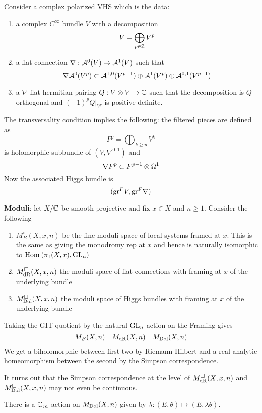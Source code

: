 \documentclass[12pt]{article}
\begin{document}
\begin{example}
Consider a complex polarized VHS which is the data:
\begin{enumerate}
\item a complex $C^{\infty}$ bundle $V$ with a decomposition
\[ V = \bigoplus_{p \in \mathbb{Z}} V^p \]
\item a flat connection $\nabla : \mathcal{A}^0(V) \to \mathcal{A}^1(V)$ such that
\[ \nabla \mathcal{A}^0(V^p) \subset \mathcal{A}^{1,0}(V^{p-1}) \oplus \mathcal{A}^{1}(V^p) \oplus \mathcal{A}^{0,1}(V^{p+1}) \]
\item a $\nabla$-flat hermitian pairing $Q : V \otimes \overline{V} \to \mathbb{C}$ such that the decomposition is $Q$-orthogonal and $(-1)^p Q|_{V^p}$ is positive-definite. 
\end{enumerate}
The transversality condition implies the following: the filtered pieces are defined as
\[ F^p = \bigoplus_{k \ge p} V^k \]
is holomorphic subbundle of $(V, \nabla^{0,1})$ and
\[ \nabla F^p \subset F^{p-1} \otimes \Omega^1 \]
Now the associated Higgs bundle is
\[ (\mathrm{gr}^F V, \mathrm{gr}^F \nabla) \] 
\end{example}

\textbf{Moduli}: let $X / \mathbb{C}$ be smooth projective and fix $x \in X$ and $n \ge 1$. Consider the following
\begin{enumerate}
\item $M^\square_B(X, x, n)$ be the fine moduli space of local systems framed at $x$. This is the same as giving the monodromy rep at $x$ and hence is naturally isomorphic to $\mathrm{Hom}_{} \left( \pi_1(X, x), \mathrm{GL}_n \right)$
\item $M_{\mathrm{dR}}^{\square}(X, x, n)$ the moduli space of flat connections with framing at $x$ of the underlying bundle
\item $M^{\square}_{\mathrm{Dol}}(X, x, n)$ the moduli space of Higgs bundles with framing at $x$ of the underlying bundle
\end{enumerate}

Taking the GIT quotient by the natural $\mathrm{GL}_n$-action on the Framing gives
\[ M_B(X, n) \quad M_{\mathrm{dR}}(X, n) \quad M_{\mathrm{Dol}}(X, n) \]
We get a biholomorphic between first two by Riemann-Hilbert and a real analytic homeomorphism between the second by the Simpson correspondence.

\begin{rmk}
It turns out that the Simpson correspondence at the level of $M_{\mathrm{dR}}^{\square}(X, x, n)$ and $M^{\square}_{\mathrm{Dol}}(X, x, n)$ may not even be continuous. 
\end{rmk}

There is a $\mathbb{G}_m$-action on $M_{\mathrm{Dol}}(X, n)$ given by $\lambda : (E, \theta) \mapsto (E, \lambda \theta)$. 
\end{document}
